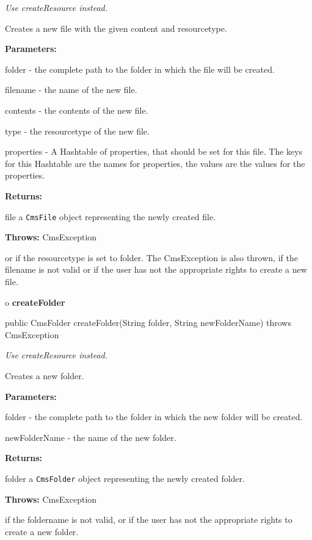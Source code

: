 \begin{description}
 {\it Use createResource
instead.} 

Creates a new file with the given content and resourcetype. 

\begin{description}
\item {\bf Parameters:}  

folder - the complete path to the folder in which the file will be created.  

filename - the name of the new file.  

contents - the contents of the new file.  

type - the resourcetype of the new file.  

properties - A Hashtable of properties, that should be set for this file. The
keys for this Hashtable are the names for properties, the values are the
values for the properties.  
\item {\bf Returns:}  

file a {\tt CmsFile} object representing the newly created file.  
\item {\bf Throws:} CmsException  

or if the resourcetype is set to folder. The CmsException is also thrown, if
the filename is not valid or if the user has not the appropriate rights to
create a new file.  
\end{description}

\end{description}

o {\bf createFolder} 

\begin{PRE}
 public CmsFolder createFolder(String folder,
                               String newFolderName) throws CmsException
\end{PRE}

\begin{description}
 {\it Use createResource
instead.} 

Creates a new folder. 

\begin{description}
\item {\bf Parameters:}  

folder - the complete path to the folder in which the new folder will be
created.  

newFolderName - the name of the new folder.  
\item {\bf Returns:}  

folder a {\tt CmsFolder} object representing the newly created folder.  
\item {\bf Throws:} CmsException  

if the foldername is not valid, or if the user has not the appropriate rights
to create a new folder.  
\end{description}

\end{description}

